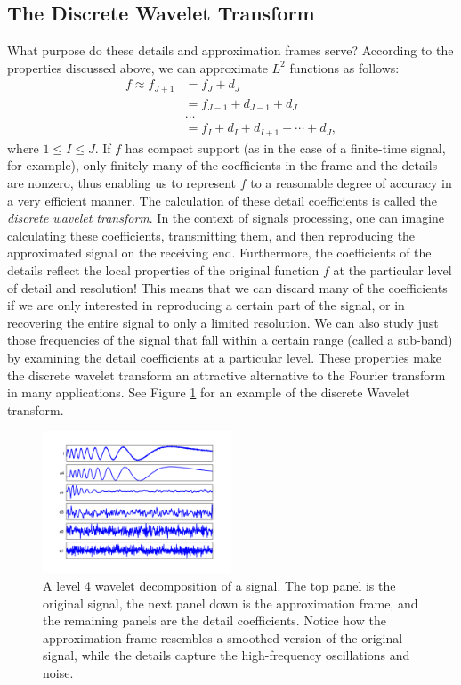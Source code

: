 \subsection*{The Discrete Wavelet Transform}

What purpose do these details and approximation frames serve? According to the
properties discussed above, we can approximate $L^2$ functions as follows:
\begin{align*}
f \approx f_{J+1} &= f_J + d_J \\
&= f_{J-1} + d_{J-1} + d_J \\
& \ldots\\
&= f_{I} + d_{I} + d_{I+1} + \cdots + d_J,
\end{align*}
where $1 \leq I \leq J$. If $f$ has compact support (as in the case of a finite-time signal,
for example), only finitely many of the coefficients in the frame and the details are
nonzero, thus enabling us to represent $f$ to a reasonable degree of accuracy in a very
efficient manner. The calculation of these detail coefficients is called the \emph{discrete
wavelet transform}. In the context of signals processing, one can imagine calculating these
coefficients, transmitting them, and then reproducing the approximated signal on the
receiving end. Furthermore, the coefficients of the details reflect the local properties
of the original function $f$ at the particular level of detail and resolution! This means
that we can discard many of the coefficients if we are only interested in reproducing a certain
part of the signal, or in recovering the entire signal to only a limited resolution. We can
also study just those frequencies of the signal that fall within a certain range (called a
sub-band) by examining the detail coefficients at a particular level. These
properties make the discrete wavelet transform an attractive alternative to the Fourier
transform in many applications. See Figure \ref{fig:dwt1D} for an example of the discrete Wavelet transform.

\begin{figure}
\centering
\includegraphics[width = 0.5\textwidth]{dwt1D}
\caption{A level 4 wavelet decomposition of a signal. The top panel is the original signal,
the next panel down is the approximation frame, and the remaining panels are the detail coefficients.
Notice how the approximation frame resembles a smoothed version of the original signal, while the
details capture the high-frequency oscillations and noise.}
\label{fig:dwt1D}
\end{figure}

